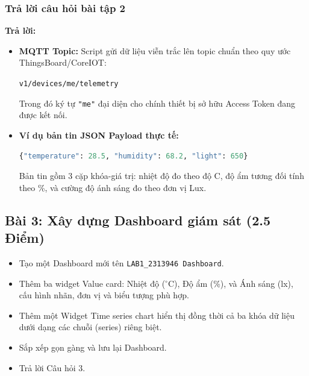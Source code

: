 \subsubsection{Trả lời câu hỏi bài tập 2}
\begin{tcolorbox}[colback=blue!5,colframe=blue!75!black,title=\textbf{Câu hỏi 2: Script gửi telemetry lên MQTT topic nào, và một bản tin trông như thế nào (viết một ví dụ payload JSON)?}]
\textbf{Trả lời:}
\begin{itemize}
    \item \textbf{MQTT Topic:} Script gửi dữ liệu viễn trắc lên topic chuẩn theo quy ước ThingsBoard/CoreIOT:
    \begin{center}
        \texttt{v1/devices/me/telemetry}
    \end{center}
    Trong đó ký tự \texttt{"me"} đại diện cho chính thiết bị sở hữu Access Token đang được kết nối.
    \item \textbf{Ví dụ bản tin JSON Payload thực tế:}
\begin{lstlisting}[language=Python]
{"temperature": 28.5, "humidity": 68.2, "light": 650}
\end{lstlisting}
    Bản tin gồm 3 cặp khóa-giá trị: nhiệt độ đo theo độ C, độ ẩm tương đối tính theo \%, và cường độ ánh sáng đo theo đơn vị Lux.
\end{itemize}
\end{tcolorbox}

\newpage
\subsection{Bài 3: Xây dựng Dashboard giám sát (2.5 Điểm)}

\begin{tcolorbox}[
    enhanced, colback=black!2, colframe=black!60, boxrule=1pt, arc=2.5mm, drop shadow,
    attach boxed title to top left={xshift=4mm, yshift=-3mm},
    boxed title style={enhanced, colback=black!85, colframe=black!85, boxrule=1pt, arc=2.5mm, drop shadow, left=6pt, right=6pt, top=2pt, bottom=2pt},
    title=\textcolor{white}{\large\textbf{Yêu cầu đề bài (Trích phiếu bài tập)}}
]
\bfseries
\vspace{0.2cm}
\begin{itemize}
    \item Tạo một Dashboard mới tên \texttt{LAB1\_2313946 Dashboard}.
    \item Thêm ba widget Value card: Nhiệt độ ($^\circ$C), Độ ẩm (\%), và Ánh sáng (lx), cấu hình nhãn, đơn vị và biểu tượng phù hợp.
    \item Thêm một Widget Time series chart hiển thị đồng thời cả ba khóa dữ liệu dưới dạng các chuỗi (series) riêng biệt.
    \item Sắp xếp gọn gàng và lưu lại Dashboard.
    \item Trả lời Câu hỏi 3.
\end{itemize}
\end{tcolorbox}

